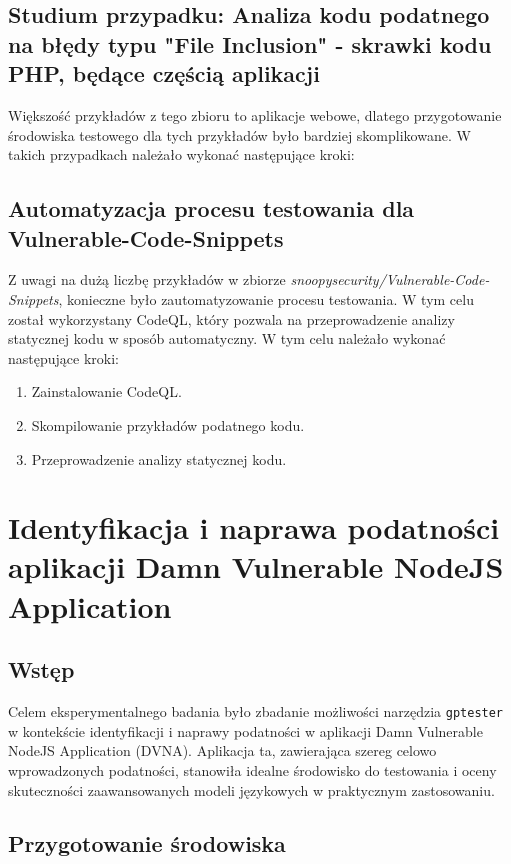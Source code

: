 \section{Studium przypadku: Analiza kodu podatnego na błędy typu "File Inclusion" - skrawki kodu PHP, będące częścią aplikacji}
\label{sec:analiza_blednego_kodu_php}

Większość przykładów z tego zbioru to aplikacje webowe, dlatego przygotowanie środowiska testowego dla tych przykładów było bardziej skomplikowane. W takich przypadkach należało wykonać następujące kroki:

\section{Automatyzacja procesu testowania dla Vulnerable-Code-Snippets}
\label{sec:automatyzacja_procesu_testowania}
Z uwagi na dużą liczbę przykładów w zbiorze \textit{snoopysecurity/Vulnerable-Code-Snippets}, konieczne było zautomatyzowanie procesu testowania. W tym celu został wykorzystany CodeQL, który pozwala na przeprowadzenie analizy statycznej kodu w sposób automatyczny. W tym celu należało wykonać następujące kroki:
\begin{enumerate}
    \item Zainstalowanie CodeQL.
    \item Skompilowanie przykładów podatnego kodu.
    \item Przeprowadzenie analizy statycznej kodu.
\end{enumerate}



\chapter{Identyfikacja i naprawa podatności aplikacji Damn Vulnerable NodeJS Application}

\section{Wstęp}

Celem eksperymentalnego badania było zbadanie możliwości narzędzia \texttt{gptester} w kontekście identyfikacji i naprawy podatności w aplikacji Damn Vulnerable NodeJS Application (DVNA). Aplikacja ta, zawierająca szereg celowo wprowadzonych podatności, stanowiła idealne środowisko do testowania i oceny skuteczności zaawansowanych modeli językowych w praktycznym zastosowaniu.

\section{Przygotowanie środowiska}

